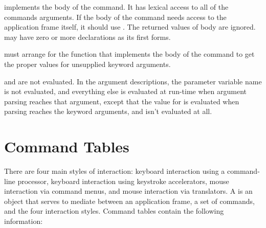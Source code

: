  implements the body of the command.  It has lexical access to all of
the commands arguments.  If the body of the command needs access to the
application frame itself, it should use .  The returned
values of body are ignored.   may have zero or more declarations as
its first forms.

 must arrange for the function that implements the body of
the command to get the proper values for unsupplied keyword arguments.

 and  are not evaluated.  In the argument
descriptions, the parameter variable name is not evaluated, and everything else
is evaluated at run-time when argument parsing reaches that argument, except
that the value for  is evaluated when parsing reaches the keyword
arguments, and  isn't evaluated at all.


\section {Command Tables}

There are four main styles of interaction: keyboard interaction using a command-
line processor, keyboard interaction using keystroke accelerators, mouse
interaction via command menus, and mouse interaction via translators.  A
 is an object that serves to mediate between an
application frame, a set of commands, and the four interaction styles.  Command
tables contain the following information:

